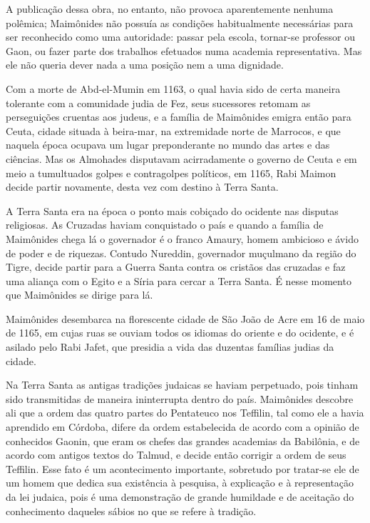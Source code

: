 A publicação dessa obra, no entanto, não provoca aparentemente nenhuma
polêmica; Maimônides não possuía as condições habitualmente necessárias
para ser reconhecido como uma autoridade: passar pela escola, tornar-se
professor ou Gaon, ou fazer parte dos trabalhos efetuados numa academia
representativa. Mas ele não queria dever nada a uma posição nem a uma
dignidade.

Com a morte de Abd-el-Mumin em 1163, o qual havia sido de certa maneira
tolerante com a comunidade judia de Fez, seus sucessores retomam as
perseguições cruentas aos judeus, e a família de Maimônides emigra então
para Ceuta, cidade situada à beira-mar, na extremidade norte de
Marrocos, e que naquela época ocupava um lugar preponderante no mundo
das artes e das ciências. Mas os Almohades disputavam acirradamente o
governo de Ceuta e em meio a tumultuados golpes e contragolpes
políticos, em 1165, Rabi Maimon decide partir novamente, desta vez com
destino à Terra Santa.

A Terra Santa era na época o ponto mais cobiçado do ocidente nas
disputas religiosas. As Cruzadas haviam conquistado o país e quando a
família de Maimônides chega lá o governador é o franco Amaury, homem
ambicioso e ávido de poder e de riquezas. Contudo Nureddin, governador
muçulmano da região do Tigre, decide partir para a Guerra Santa contra
os cristãos das cruzadas e faz uma aliança com o Egito e a Síria para
cercar a Terra Santa. É nesse momento que Maimônides se dirige para lá.

Maimônides desembarca na florescente cidade de São João de Acre em 16 de
maio de 1165, em cujas ruas se ouviam todos os idiomas do oriente e do
ocidente, e é asilado pelo Rabi Jafet, que presidia a vida das duzentas
famílias judias da cidade.

Na Terra Santa as antigas tradições judaicas se haviam perpetuado, pois
tinham sido transmitidas de maneira ininterrupta dentro do país. Maimônides descobre ali que a ordem das quatro partes do Pentateuco nos
Teffilin, tal como ele a havia aprendido em Córdoba, difere da ordem
estabelecida de acordo com a opinião de conhecidos Gaonin, que eram os
chefes das grandes academias da Babilônia, e de acordo com antigos
textos do Talmud, e decide então corrigir a ordem de seus Teffilin. Esse
fato é um acontecimento importante, sobretudo por tratar-se ele de um
homem que dedica sua existência à pesquisa, à explicação e à
representação da lei judaica, pois é uma demonstração de grande
humildade e de aceitação do conhecimento daqueles sábios no que se
refere à tradição.

